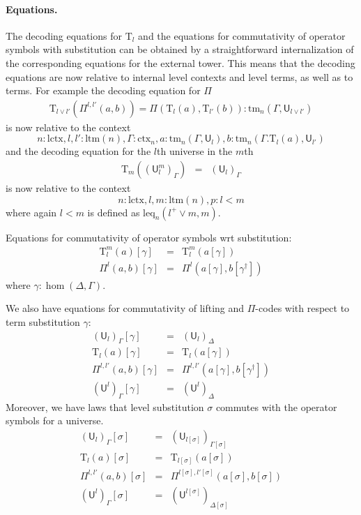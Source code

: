 \documentclass[11pt,a4paper]{article}
\theoremstyle{plain}
\theoremstyle{definition}
\newcommand{\UU}{\mathsf{U}}
\def\UU{\mathsf{U}}
\newcommand{\N}{\mathsf{N}}
\def\lctx{\mathrm{lctx}}
\def\ltm{\mathrm{ltm}}
\def\leq{\mathrm{leq}}
\newcommand{\ctx}{\mathrm{ctx}}
\newcommand{\tm}{\mathrm{tm}}
\def\U{\mathsf{U}}
\newcommand{\Ta}{\mathrm{T}}
\begin{document}
\paragraph{Equations.}
The decoding equations for $\Ta_l$ and the equations for commutativity of operator symbols with substitution can be obtained by a straightforward internalization of the corresponding equations for the external tower. This means that the decoding equations are now relative to internal level contexts and level terms, as well as to terms. For example the decoding equation for $\Pi$ 
\begin{eqnarray*}
\Ta_{l \vee l'}(\Pi^{l,l'}(a,b)) = \Pi(\Ta_l(a),\Ta_{l'}(b)) :\tm_n(\Gamma,\UU_{l \vee l'})
\end{eqnarray*}
is now relative to the context
$$
n : \lctx, l, l' : \ltm(n), \Gamma : \ctx_n, a : \tm_n(\Gamma,\UU_l), b : \tm_n(\Gamma.\Ta_l(a),\UU_{l'} )
$$
and the decoding equation for the $l$th universe in the $m$th
\begin{eqnarray*}
\Ta_{m}((\UU^m_l)_\Gamma) &=& (\UU_l)_\Gamma
\end{eqnarray*}
is now relative to the context
$$
n : \lctx, l, m : \ltm(n), p : l < m
$$
where again $l < m$ is defined as $\leq_n(l^+ \vee m, m)$.

Equations for commutativity of operator symbols wrt substitution:
\begin{eqnarray*}
\Ta^m_l(a) [ \gamma ] &=& \Ta^m_l(a[ \gamma ] )\\
\Pi^{l}(a,b)[ \gamma ] &=& \Pi^{l}(a [ \gamma ], b[ \gamma^\dagger ])
\end{eqnarray*}
 where $\gamma : \hom(\Delta,\Gamma)$.
 
We also have equations for commutativity of lifting and $\Pi$-codes with respect to term substitution $\gamma$:
 \begin{eqnarray*}
(\U_l)_\Gamma [ \gamma ] &=& (\U_l)_\Delta\\
\Ta_l(a) [ \gamma ] &=& \Ta_l(a[ \gamma ] )\\
\Pi^{l,l'}(a,b)[ \gamma ] &=& \Pi^{l,l'}(a [ \gamma ], b[ \gamma^\dagger ])\\
(\UU^l)_\Gamma[ \gamma ] &=&(\UU^l)_\Delta
\end{eqnarray*}
Moreover, we have laws that level substitution $\sigma$ commutes with the operator symbols for a universe.
 \begin{eqnarray*}
 (\U_{l})_\Gamma[\sigma] &=& (\U_{l[\sigma]})_{\Gamma[\sigma]}\\
 \Ta_l(a) [ \sigma ] &=& \Ta_{l[\sigma]}(a[ \sigma ] )\\
\Pi^{l,l'}(a,b)[ \sigma ] &=& \Pi^{l[ \sigma ] ,l'[ \sigma ] }(a [ \sigma ], b[ \sigma])\\
(\UU^l)_\Gamma[ \sigma ] &=&(\UU^{l[ \sigma ]} )_{\Delta[ \sigma ]} 
 \end{eqnarray*}
\end{document}
